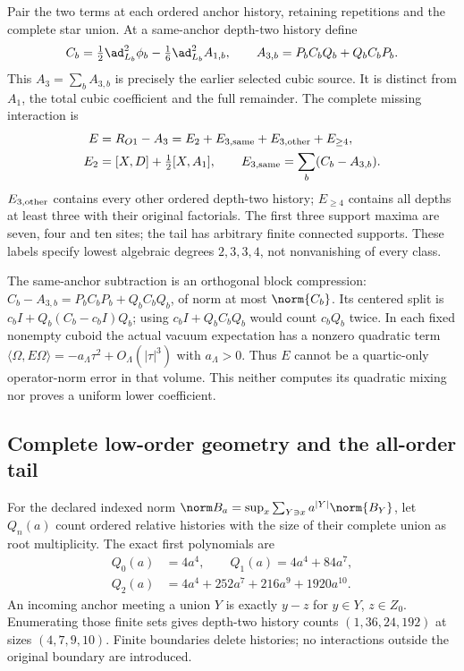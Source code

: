 Pair the two terms at each ordered anchor history, retaining repetitions and the complete star union. At a same-anchor depth-two history define
\begin{equation}
C_b=\tfrac12\ad_{L_b}^2\phi_b-\tfrac16\ad_{L_b}^2A_{1,b},\qquad
A_{3,b}=P_bC_bQ_b+Q_bC_bP_b.
\label{r28:ag2:cubic}
\end{equation}
This $A_3=\sum_bA_{3,b}$ is precisely the earlier selected cubic source. It is distinct from $A_1$, the total cubic coefficient and the full remainder. The complete missing interaction is
\begin{align}
E&=R_{O1}-A_3=E_2+E_{3,\rm same}+E_{3,\rm other}+E_{\ge4},\nonumber\\
E_2&=[X,D]+\tfrac12[X,A_1],\qquad
E_{3,\rm same}=\sum_b(C_b-A_{3,b}).
\label{r28:ag2:inventory}
\end{align}
$E_{3,\rm other}$ contains every other ordered depth-two history; $E_{\ge4}$ contains all depths at least three with their original factorials. The first three support maxima are seven, four and ten sites; the tail has arbitrary finite connected supports. These labels specify lowest algebraic degrees $2,3,3,4$, not nonvanishing of every class.

The same-anchor subtraction is an orthogonal block compression:
$C_b-A_{3,b}=P_bC_bP_b+Q_bC_bQ_b$, of norm at most $\norm{C_b}$. Its centered split is $c_bI+Q_b(C_b-c_bI)Q_b$; using $c_bI+Q_bC_bQ_b$ would count $c_bQ_b$ twice. In each fixed nonempty cuboid the actual vacuum expectation has a nonzero quadratic term
$\langle\Omega,E\Omega\rangle=-a_\Lambda\tau^2+O_\Lambda(|\tau|^3)$ with $a_\Lambda>0$. Thus $E$ cannot be a quartic-only operator-norm error in that volume. This neither computes its quadratic mixing nor proves a uniform lower coefficient.

\subsection{Complete low-order geometry and the all-order tail}
For the declared indexed norm $\norm B_a=\sup_x\sum_{Y\ni x}a^{|Y|}\norm{B_Y}$, let $Q_n(a)$ count ordered relative histories with the size of their complete union as root multiplicity. The exact first polynomials are
\begin{align}
Q_0(a)&=4a^4,\qquad Q_1(a)=4a^4+84a^7,\nonumber\\
Q_2(a)&=4a^4+252a^7+216a^9+1920a^{10}.
\label{r28:ag2:geometry}
\end{align}
An incoming anchor meeting a union $Y$ is exactly $y-z$ for $y\in Y$, $z\in Z_0$. Enumerating those finite sets gives depth-two history counts $(1,36,24,192)$ at sizes $(4,7,9,10)$. Finite boundaries delete histories; no interactions outside the original boundary are introduced.

